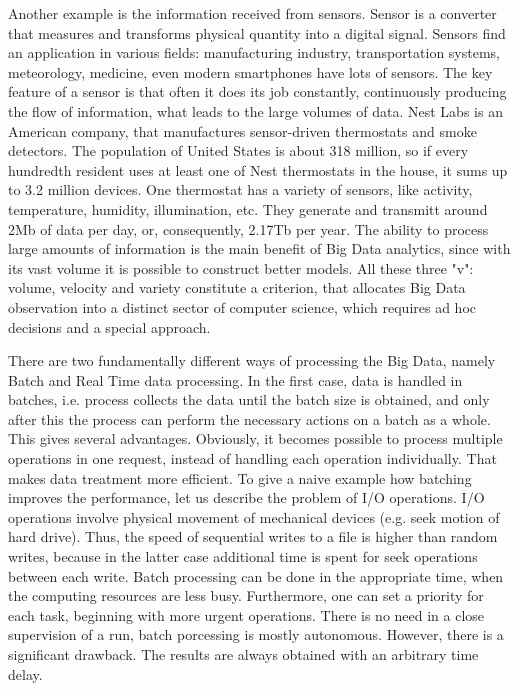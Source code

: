 Another example is the information received from sensors.
Sensor is a converter that measures and transforms physical quantity into a digital signal.
Sensors find an application in various fields: manufacturing industry, transportation systems, meteorology, medicine, even modern smartphones have lots of sensors.
The key feature of a sensor is that often it does its job constantly, continuously producing the flow of information, what leads to the large volumes of data.
Nest Labs is an American company, that manufactures sensor-driven thermostats and smoke detectors.
The population of United States is about 318 million, so if every hundredth resident uses at least one of Nest thermostats in the house, it sums up to 3.2 million devices.
One thermostat has a variety of sensors, like activity, temperature, humidity, illumination, etc.
They generate and transmitt around 2Mb of data per day, or, consequently, 2.17Tb per year. 
The ability to process large amounts of information is the main benefit of Big Data analytics, since with its vast volume it is possible to construct better models.
All these three "v": volume, velocity and variety constitute a criterion, that allocates Big Data observation into a distinct sector of computer science, which requires ad hoc decisions and a special approach.

There are two fundamentally different ways of processing the Big Data, namely Batch and Real Time data processing.
In the first case, data is handled in batches, i.e. process collects the data until the batch size is obtained, and only after this the process can perform the necessary actions on a batch as a whole.
This gives several advantages.
Obviously, it becomes possible to process multiple operations in one request, instead of handling each operation individually.
That makes data treatment more efficient. 
To give a naive example how batching improves the performance, let us describe the problem of I/O operations.
I/O operations involve physical movement of mechanical devices (e.g. seek motion of hard drive).
Thus, the speed of sequential writes to a file is higher than random writes, because in the latter case additional time is spent for seek operations between each write.   
Batch processing can be done in the appropriate time, when the computing resources are less busy.
Furthermore, one can set a priority for each task, beginning with more urgent operations.
There is no need in a close supervision of a run, batch porcessing is mostly autonomous.
However, there is a significant drawback.
The results are always obtained with an arbitrary time delay.

